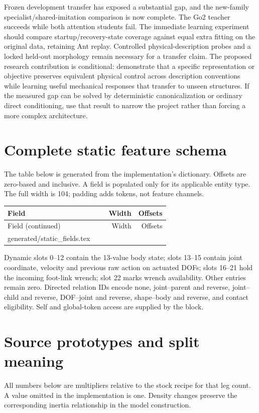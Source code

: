 \documentclass[11pt,letterpaper]{article}
\makeatletter
\newcommand{\tableinput}[1]{\@@input #1 }
\makeatother
\begin{document}
Frozen development transfer has exposed a substantial gap, and the new-family
specialist/shared-imitation comparison is now complete. The Go2 teacher succeeds
while both attention students fail. The immediate learning experiment should
compare startup/recovery-state coverage against equal extra fitting on the
original data, retaining Ant replay. Controlled physical-description probes and
a locked held-out morphology remain necessary for a transfer claim. The proposed
research contribution is conditional: demonstrate that a specific representation
or objective preserves equivalent physical control across description conventions
while learning useful mechanical responses that transfer to unseen structures.
If the measured gap can be solved by deterministic canonicalization or ordinary
direct conditioning, use that result to narrow the project rather than forcing
a more complex architecture.

\clearpage
\appendix
\section{Complete static feature schema}
\label{app:schema}
The table below is generated from the implementation's
 dictionary. Offsets are zero-based and inclusive. A field is
populated only for its applicable entity type. The full width is 104; padding
adds tokens, not feature channels.

\begin{longtable}{@{}p{0.64\linewidth}rr@{}}
\toprule
Field & Width & Offsets\\
\midrule
\endfirsthead
\toprule
Field (continued) & Width & Offsets\\
\midrule
\endhead
\tableinput{generated/static_fields.tex}
\bottomrule
\end{longtable}

Dynamic slots 0--12 contain the 13-value body state; slots 13--15 contain joint
coordinate, velocity and previous raw action on actuated DOFs; slots 16--21 hold
the incoming foot-link wrench; slot 22 marks wrench availability. Other entries
remain zero. Directed relation IDs encode none, joint--parent and reverse,
joint--child and reverse, DOF--joint and reverse, shape--body and reverse, and
contact eligibility. Self and global-token access are supplied by the block.

\section{Source prototypes and split meaning}
\label{app:population}
All numbers below are multipliers relative to the stock recipe for that leg
count. A value omitted in the implementation is one. Density changes preserve
the corresponding inertia relationship in the model construction.
\end{document}
